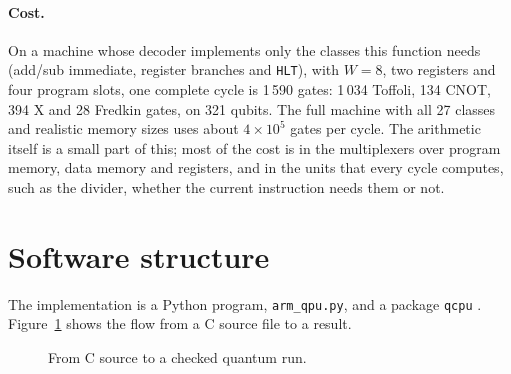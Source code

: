 \documentclass[11pt]{article}
\begin{document}
\paragraph{Cost.} On a machine whose decoder implements only the classes this function needs
(add/sub immediate, register branches and \texttt{HLT}), with $W = 8$, two registers and four
program slots, one complete cycle is 1\,590 gates: 1\,034 Toffoli, 134 CNOT, 394 X and 28
Fredkin gates, on 321 qubits. The full machine with all 27 classes and realistic memory sizes
uses about $4\times10^{5}$ gates per cycle. The arithmetic itself is a small part of this;
most of the cost is in the multiplexers over program memory, data memory and registers, and
in the units that every cycle computes, such as the divider, whether the current instruction
needs them or not.

\section{Software structure}
\label{sec:software}

The implementation is a Python program, \texttt{arm\_qpu.py}, and a package \texttt{qcpu}
\cite{armqpu}. Figure~\ref{fig:pipeline} shows the flow from a C source file to a result.

\begin{figure}[H]
\centering
{}
\caption{From C source to a checked quantum run.}
\label{fig:pipeline}
\end{figure}
\end{document}
